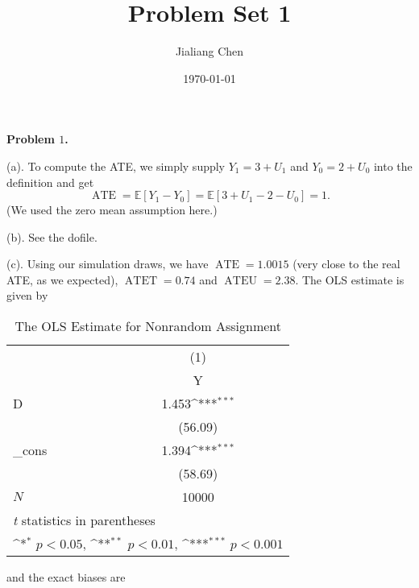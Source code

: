 \documentclass[11pt,a4paper]{amsart}
\theoremstyle{plain}
\theoremstyle{definition}
\begin{document}
\title{Problem Set 1}
\author{Jialiang Chen}
\date{\today}
\maketitle

\textbf{Problem $1$.}\hfill\par 

\vspace{5pt}

(a). To compute the ATE, we simply supply $Y_{1} = 3 + U_{1}$ and $Y_{0} = 2 + U_{0}$ into the definition and get
\[	\operatorname{ATE} = \mathbb{E}[Y_{1} - Y_{0}] = \mathbb{E}[3 + U_{1} -  2 - U_{0} ] = 1.	\]
(We used the zero mean assumption here.)
\vspace{5pt}

(b). See the dofile. \par 

\vspace{5pt}

(c). Using our simulation draws, we have $\operatorname{ATE} =  1.0015$ (very close to the real ATE, as we expected), $\operatorname{ATET} =   0.74$ and  $\operatorname{ATEU} =   2.38$. The OLS estimate is given by 

\vspace{10pt}

\begin{table}[hb]
	\caption{\label{tb:nonrand} The OLS Estimate for Nonrandom Assignment}
	{
	\def\sym#1{\ifmmode^{#1}\else\(^{#1}\)\fi}
	\begin{tabular}{l*{1}{c}}
		\hline\hline
		&\multicolumn{1}{c}{(1)}\\
		&\multicolumn{1}{c}{Y}\\
		\hline
		D           &       1.453\sym{***}\\
		&     (56.09)         \\
		[1em]
		\_cons      &       1.394\sym{***}\\
		&     (58.69)         \\
		\hline
		\(N\)       &       10000         \\
		\hline\hline
		\multicolumn{2}{l}{\footnotesize \textit{t} statistics in parentheses}\\
		\multicolumn{2}{l}{\footnotesize \sym{*} \(p<0.05\), \sym{**} \(p<0.01\), \sym{***} \(p<0.001\)}\\
	\end{tabular}
}
\end{table}


and the exact biases are 
\end{document}

